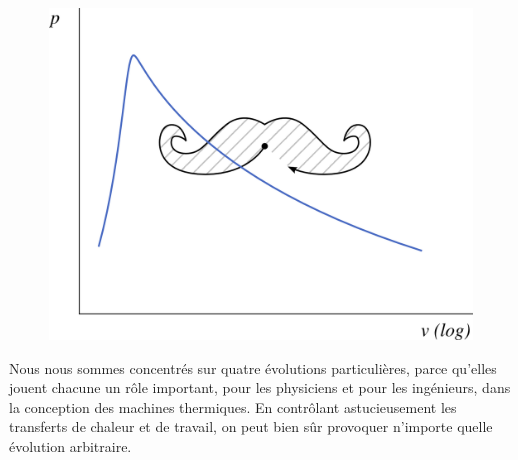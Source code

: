 		\begin{figure}
			\begin{center}
				\includegraphics[width=\pvdiagramwidth]{images/pv_lv_moustache.png}
			\end{center}
			\label{fig_lv_pv_moustache}
		\end{figure}
		
		Nous nous sommes concentrés sur quatre évolutions particulières, parce qu’elles jouent chacune un rôle important, pour les physiciens et pour les ingénieurs, dans la conception des machines thermiques. En contrôlant astucieusement les transferts de chaleur et de travail, on peut bien sûr provoquer n’importe quelle évolution arbitraire.
